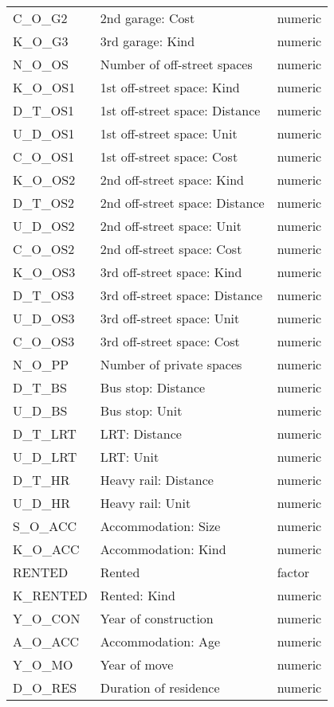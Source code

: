 \begin{longtable}{lll}
  C\_O\_G2 & 2nd garage: Cost & numeric \\ 
  K\_O\_G3 & 3rd garage: Kind & numeric \\ 
  N\_O\_OS & Number of off-street spaces & numeric \\ 
  K\_O\_OS1 & 1st off-street space: Kind & numeric \\ 
  D\_T\_OS1 & 1st off-street space: Distance & numeric \\ 
  U\_D\_OS1 & 1st off-street space: Unit & numeric \\ 
  C\_O\_OS1 & 1st off-street space: Cost & numeric \\ 
  K\_O\_OS2 & 2nd off-street space: Kind & numeric \\ 
  D\_T\_OS2 & 2nd off-street space: Distance & numeric \\ 
  U\_D\_OS2 & 2nd off-street space: Unit & numeric \\ 
  C\_O\_OS2 & 2nd off-street space: Cost & numeric \\ 
  K\_O\_OS3 & 3rd off-street space: Kind & numeric \\ 
  D\_T\_OS3 & 3rd off-street space: Distance & numeric \\ 
  U\_D\_OS3 & 3rd off-street space: Unit & numeric \\ 
  C\_O\_OS3 & 3rd off-street space: Cost & numeric \\ 
  N\_O\_PP & Number of private spaces & numeric \\ 
  D\_T\_BS & Bus stop: Distance & numeric \\ 
  U\_D\_BS & Bus stop: Unit & numeric \\ 
  D\_T\_LRT & LRT: Distance & numeric \\ 
  U\_D\_LRT & LRT: Unit & numeric \\ 
  D\_T\_HR & Heavy rail: Distance & numeric \\ 
  U\_D\_HR & Heavy rail: Unit & numeric \\ 
  S\_O\_ACC & Accommodation: Size & numeric \\ 
  K\_O\_ACC & Accommodation: Kind & numeric \\ 
  RENTED & Rented & factor \\ 
  K\_RENTED & Rented: Kind & numeric \\ 
  Y\_O\_CON & Year of construction & numeric \\ 
  A\_O\_ACC & Accommodation: Age & numeric \\ 
  Y\_O\_MO & Year of move & numeric \\ 
  D\_O\_RES & Duration of residence & numeric \\ 

\end{longtable}
